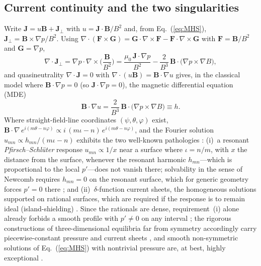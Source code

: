 \documentclass[english]{article}
\newcommand{\bB}{\mathbf{B}}
\newcommand{\bJ}{\mathbf{J}}
\begin{document}
\subsection{Current continuity and the two singularities}
\label{sec:singular_currents}

Write $\bJ=u\bB+\bJ_\perp$ with $u=\bJ\cdot\bB/B^2$ and, from Eq.~(\ref{eq:MHS}),
$\bJ_\perp=\bB\times\nabla p/B^2$. Using $\nabla\cdot(\mathbf{F}\times\mathbf{G})
=\mathbf{G}\cdot\nabla\times\mathbf{F}-\mathbf{F}\cdot\nabla\times\mathbf{G}$ with
$\mathbf{F}=\bB/B^2$ and $\mathbf{G}=\nabla p$,
\begin{equation}
\nabla\cdot\bJ_\perp
=\nabla p\cdot\nabla\times\!\Big(\frac{\bB}{B^{2}}\Big)
=\frac{\mu_0\,\bJ\cdot\nabla p}{B^{2}}
-\frac{2}{B^{3}}\,\bB\cdot\big(\nabla p\times\nabla B\big) ,
\label{eq:divJperp}
\end{equation}
and quasineutrality $\nabla\cdot\bJ=0$ with $\nabla\cdot(u\bB)=\bB\cdot\nabla u$ gives, in the
classical model where $\bB\cdot\nabla p=0$ (so $\bJ\cdot\nabla p=0$), the magnetic differential
equation (MDE)
\begin{equation}
\bB\cdot\nabla u=\frac{2}{B^{3}}\,\bB\cdot\big(\nabla p\times\nabla B\big)\equiv h .
\label{eq:MDE}
\end{equation}
Where straight-field-line coordinates $(\psi,\theta,\varphi)$ exist,
$\bB\cdot\nabla\,e^{i(m\theta-n\varphi)}\propto i\,(m\iota-n)\,e^{i(m\theta-n\varphi)}$, and the
Fourier solution $u_{mn}\propto h_{mn}/(m\iota-n)$ exhibits the two well-known pathologies
\cite{newcomb1959,boozer1981,loizu2015a,loizu2015b,helander2014}: (i)~a resonant
\emph{Pfirsch--Schl\"uter} response $u_{mn}\propto 1/x$ near a surface where $\iota=n/m$, with
$x$ the distance from the surface, whenever the resonant harmonic $h_{mn}$---which is proportional
to the local $p'$---does not vanish there; solvability in the sense of Newcomb requires
$h_{mn}=0$ on the resonant surface, which for generic geometry forces $p'=0$ there
\cite{newcomb1959,boozer1981,cary1985}; and (ii)~$\delta$-function current sheets, the homogeneous
solutions supported on rational surfaces, which are required if the response is to remain ideal
(island-shielding) \cite{loizu2015a,loizu2015b}. Since the rationals are dense, requirement~(i)
alone already forbids a smooth profile with $p'\ne0$ on any interval \cite{boozer1981,grad1967};
the rigorous constructions of three-dimensional equilibria far from symmetry accordingly carry
piecewise-constant pressure and current sheets \cite{bruno1996,enciso2025}, and smooth
non-symmetric solutions of Eq.~(\ref{eq:MHS}) with nontrivial pressure are, at best, highly
exceptional \cite{constantin2021}.
\end{document}
